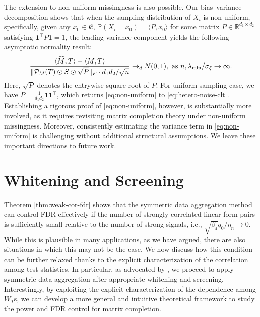 \documentclass[12pt]{article}
\newcommand{\tF}{{\rm F}}
\newcommand{\PP}{\mathbb{P}}
\newcommand{\R}{\mathbb{R}}
\newcommand{\cP}{\mathcal{P}}
\def\PP{{\mathbb P}}
\theoremstyle{plain}
\begin{document}
\begin{sloppypar}
The extension to non-uniform missingness is also possible. Our bias–variance decomposition shows that when the sampling distribution of $X_i$ is non-uniform, specifically, given any  $x_0 \in \mathfrak{E}$, $\PP(X_i=x_0)=\langle P,x_0 \rangle$ for some matrix $P\in \R_+^{d_1\times d_2}$ satisfying $\mathbf{1}^\top P \mathbf{1} = 1$, the leading variance component yields the following asymptotic normality result:
\begin{equation}\label{eq:non-uniform}
    \frac{\langle \widehat{M}, T\rangle-\langle M, T\rangle}{\|\cP_M(T) \odot S \odot  \sqrt{P} \|_\tF \cdot d_1 d_2 /\sqrt{n} } \to_d N(0,1), \text{  as }n, \lambda_{\min}/\sigma_{\xi} \to \infty. 
\end{equation}
Here, $\sqrt{P} $ denotes the entrywise square root of $P$. For uniform sampling case, we have $P=\frac{1}{d_1 d_2}\mathbf{1} \mathbf{1}^\top   $, which returns \eqref{eq:non-uniform} to \eqref{eq:hetero-noise-clt}. Establishing a rigorous proof of \eqref{eq:non-uniform}, however, is substantially more involved, as it requires revisiting matrix completion theory under non-uniform missingness. Moreover, consistently estimating the variance term in \eqref{eq:non-uniform} is challenging without additional structural assumptions. We leave these important directions to future work.



\section{Whitening and Screening}\label{sec:strong-corr}
Theorem \ref{thm:weak-cor-fdr} shows that the symmetric data aggregation method can control FDR effectively if the number of strongly correlated linear form pairs is sufficiently small relative to the number of strong signals, i.e., $\sqrt{\beta_{\mathsf{s}}}q_0/\eta_n\to 0$. While this is plausible in many applications, as we have argued, there are also situations in which this may not be the case. We now discuss how this condition can be further relaxed thanks to the explicit characterization of the correlation among test statistics. In particular, as advocated by \cite{du2021false}, we proceed to apply symmetric data aggregation after appropriate whitening  and screening. Interestingly, by exploiting the explicit characterization of the dependence among $W_T$s, we can develop a more general and intuitive theoretical framework to study the power and FDR control for matrix completion. 



\end{sloppypar}
\end{document}
